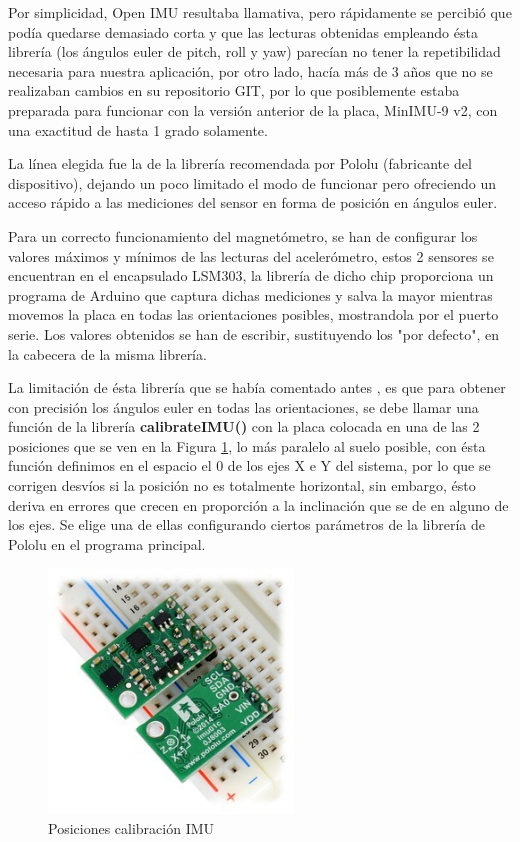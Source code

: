 Por simplicidad, Open IMU resultaba llamativa, pero rápidamente se percibió que podía quedarse demasiado corta y que las lecturas obtenidas empleando ésta librería (los ángulos euler de pitch, roll y yaw) parecían no tener la repetibilidad necesaria para nuestra aplicación, por otro lado, hacía más de 3 años que no se realizaban cambios en su repositorio GIT, por lo que posiblemente estaba preparada para funcionar con la versión anterior de la placa, MinIMU-9 v2, con una exactitud de hasta 1 grado solamente.

La línea elegida fue la de la librería recomendada por Pololu (fabricante del dispositivo), dejando un poco limitado el modo de funcionar pero ofreciendo un acceso rápido a las mediciones del sensor en forma de posición en ángulos euler.

Para un correcto funcionamiento del magnetómetro, se han de configurar los valores máximos y mínimos de las lecturas del acelerómetro, estos 2 sensores se encuentran en el encapsulado LSM303, la librería de dicho chip proporciona un programa de Arduino que captura dichas mediciones y salva la mayor mientras movemos la placa en todas las orientaciones posibles, mostrandola por el puerto serie. Los valores obtenidos se han de escribir, sustituyendo los "por defecto", en la cabecera de la misma librería.

La limitación de ésta librería que se había comentado antes , es que para obtener con precisión los ángulos euler en todas las orientaciones, se debe llamar una función de la librería \textbf{calibrateIMU()} con la placa colocada en una de las 2 posiciones que se ven en la Figura \ref{fig:IMU_positions}, lo más paralelo al suelo posible, con ésta función definimos en el espacio el 0 de los ejes X e Y del sistema, por lo que se corrigen desvíos si la posición no es totalmente horizontal, sin embargo, ésto deriva en errores que crecen en proporción a la inclinación que se de en alguno de los ejes. Se elige una de ellas configurando ciertos parámetros de la librería de Pololu en el programa principal.

\begin{figure}
\centering
\includegraphics[width=65mm]{Figures/IMU_positions}
\caption[Posiciones calibración IMU]{Posiciones calibración IMU}
\label{fig:IMU_positions}
\end{figure}

